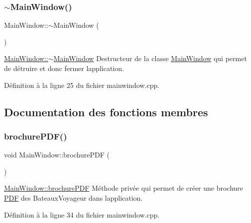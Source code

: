 \subsubsection{\texorpdfstring{$\sim$\+Main\+Window()}{~MainWindow()}}
{\footnotesize\ttfamily Main\+Window\+::$\sim$\+Main\+Window (\begin{DoxyParamCaption}{ }\end{DoxyParamCaption})}



\hyperlink{class_main_window_ae98d00a93bc118200eeef9f9bba1dba7}{Main\+Window\+::$\sim$\+Main\+Window} Destructeur de la classe \hyperlink{class_main_window}{Main\+Window} qui permet de détruire et donc fermer l\textquotesingle{}application. 



Définition à la ligne 25 du fichier mainwindow.\+cpp.



\subsection{Documentation des fonctions membres}
\mbox{\label{class_main_window_a6db0e3a1a7ce60c36d151d1ae618f16c}} 
\subsubsection{\texorpdfstring{brochure\+P\+D\+F()}{brochurePDF()}}
{\footnotesize\ttfamily void Main\+Window\+::brochure\+P\+DF (\begin{DoxyParamCaption}{ }\end{DoxyParamCaption})\hspace{0.3cm}{\ttfamily [private]}}



\hyperlink{class_main_window_a6db0e3a1a7ce60c36d151d1ae618f16c}{Main\+Window\+::brochure\+P\+DF} Méthode privée qui permet de créer une brochure \hyperlink{class_p_d_f}{P\+DF} des Bateaux\+Voyageur dans l\textquotesingle{}application. 



Définition à la ligne 34 du fichier mainwindow.\+cpp.

